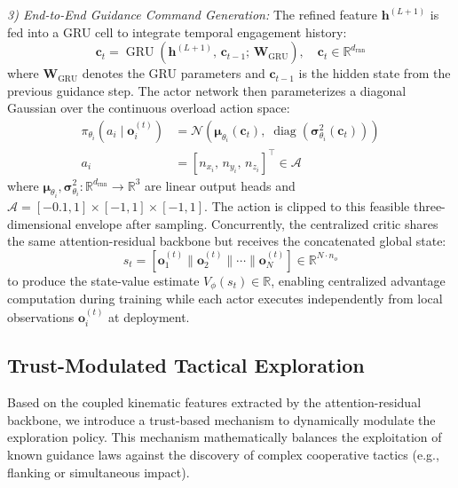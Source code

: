 \documentclass[lettersize,journal]{IEEEtran}
\begin{document}
\emph{3) End-to-End Guidance Command Generation:} The refined feature $\mathbf{h}^{(L+1)}$ is fed into a GRU cell to integrate temporal engagement history:
\begin{equation}
\label{eq:gru}
\mathbf{c}_t = \operatorname{GRU}\!\left(\mathbf{h}^{(L+1)},\, \mathbf{c}_{t-1};\, \mathbf{W}_{\mathrm{GRU}}\right), \quad \mathbf{c}_t \in \mathbb{R}^{d_{\mathrm{rnn}}}
\end{equation}
where $\mathbf{W}_{\mathrm{GRU}}$ denotes the GRU parameters and $\mathbf{c}_{t-1}$ is the hidden state from the previous guidance step. The actor network then parameterizes a diagonal Gaussian over the continuous overload action space:
\begin{equation}
\label{eq:actor_dist}
\begin{split}
\pi_{\theta_i}\!\left(a_i \mid \mathbf{o}_i^{(t)}\right) &= \mathcal{N}\!\left(\boldsymbol{\mu}_{\theta_i}(\mathbf{c}_t),\; \operatorname{diag}\!\left(\boldsymbol{\sigma}_{\theta_i}^2(\mathbf{c}_t)\right)\right) \\
a_i &= [n_{x_i},\, n_{y_i},\,n_{z_i}]^\top \in \mathcal{A}
\end{split}
\end{equation}
where $\boldsymbol{\mu}_{\theta_i}, \boldsymbol{\sigma}_{\theta_i}^2:
\mathbb{R}^{d_{\mathrm{rnn}}} \to \mathbb{R}^3$ are linear output heads and
\(\mathcal A=[-0.1,1]\times[-1,1]\times[-1,1]\). The action is clipped to
this feasible three-dimensional envelope after sampling. Concurrently, the
centralized critic shares the same attention-residual backbone but receives the
concatenated global state:
\begin{equation}
\label{eq:critic_input}
s_t = \left[\mathbf{o}_1^{(t)} \| \mathbf{o}_2^{(t)} \| \cdots \| \mathbf{o}_N^{(t)}\right] \in \mathbb{R}^{N \cdot n_o}
\end{equation}
to produce the state-value estimate $V_\phi(s_t) \in \mathbb{R}$, enabling centralized advantage computation during training while each actor executes independently from local observations $\mathbf{o}_i^{(t)}$ at deployment.

\subsection{Trust-Modulated Tactical Exploration}
\label{subsec:trust_exploration}

Based on the coupled kinematic features extracted by the
attention-residual backbone, we introduce a trust-based mechanism to dynamically
modulate the exploration policy. This mechanism mathematically balances the
exploitation of known guidance laws against the discovery of complex
cooperative tactics (e.g., flanking or simultaneous impact).
\end{document}
